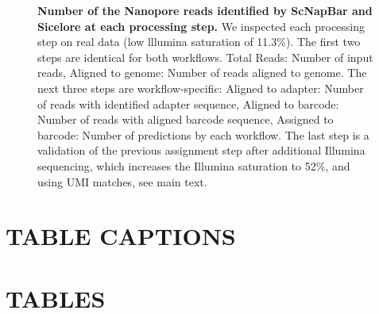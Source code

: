 \documentclass[times, 11pt, a4paper]{article}
\begin{document}
\begin{figure}[h!]
         \centering
         \label{fig:fc1realsteps}
        \caption{\textbf{Number of the Nanopore reads identified by ScNapBar and Sicelore at each processing step.}  We inspected each processing step on real data (low lllumina saturation of 11.3\%). The first two steps are identical for both workflows. Total Reads: Number of input reads, Aligned to genome: Number of reads aligned to genome. The next three steps are workflow-specific: Aligned to adapter: Number of reads with identified adapter sequence, Aligned to barcode: Number of reads with aligned barcode sequence, Assigned to barcode: Number of predictions by each workflow. The last step is a validation of the previous assignment step after additional Illumina sequencing, which increases the Illumina saturation to 52\%, and using UMI matches, see main text.}
        \label{fig:realsteps}
\end{figure}

\section*{TABLE CAPTIONS}
\section*{TABLES}
\end{document}
